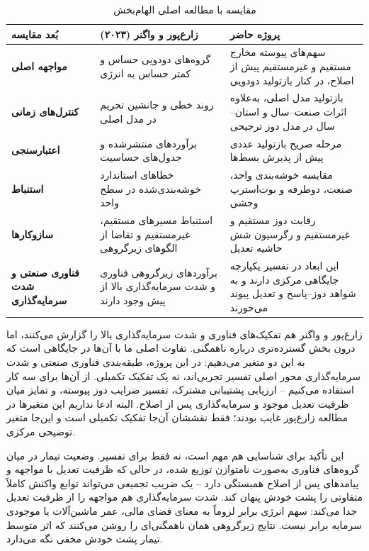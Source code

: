 \documentclass[11pt]{article}
\begin{document}
\begin{table}[htbp]
\centering
\caption{مقایسه با مطالعه اصلی الهام‌بخش}
\label{tab:comparison}
\begin{tabularx}{\textwidth}{>{\raggedleft\arraybackslash\bfseries}p{}YY}
\toprule
بُعد مقایسه & زارع‌پور و واگنر (۲۰۲۳) & پروژه حاضر \\
\midrule
مواجهه اصلی & گروه‌های دودویی حساس و کمتر حساس به انرژی & سهم‌های پیوسته مخارج مستقیم و غیرمستقیم پیش از اصلاح، در کنار بازتولید دودویی \\
کنترل‌های زمانی & روند خطی و جانشین تحریم در مدل اصلی & بازتولید مدل اصلی، به‌علاوه اثرات صنعت--سال و استان--سال در مدل دوز ترجیحی \\
اعتبارسنجی & برآوردهای منتشرشده و جدول‌های حساسیت & مرحله صریح بازتولید عددی پیش از پذیرش بسط‌ها \\
استنباط & خطاهای استاندارد خوشه‌بندی‌شده در سطح واحد & مقایسه خوشه‌بندی واحد، صنعت، دوطرفه و بوت‌استرپ وحشی \\
سازوکارها & استنباط مسیرهای مستقیم، غیرمستقیم و تقاضا از الگوهای زیرگروهی & رقابت دوز مستقیم و غیرمستقیم و رگرسیون شش حاشیه تعدیل \\
فناوری صنعتی و شدت سرمایه‌گذاری & برآوردهای زیرگروهی فناوری و شدت سرمایه‌گذاری بالا از پیش وجود دارند & این ابعاد در تفسیر یکپارچه جایگاهی مرکزی دارند و به شواهد دوز--پاسخ و تعدیل پیوند می‌خورند \\
\bottomrule
\end{tabularx}
\end{table}

زارع‌پور و واگنر هم تفکیک‌های فناوری و شدت سرمایه‌گذاری بالا را گزارش می‌کنند، اما درون بخش گسترده‌تری درباره ناهمگنی. تفاوت اصلی ما با آن‌ها در جایگاهی است که به این دو متغیر می‌دهیم: در این پروژه، طبقه‌بندی فناوری صنعتی و شدت سرمایه‌گذاری محور اصلی تفسیر تجربی‌اند، نه یک تفکیک تکمیلی. از آن‌ها برای سه کار استفاده می‌کنیم -- ارزیابی پشتیبانی مشترک، تفسیر ضرایب دوز پیوسته، و تمایز میان ظرفیت تعدیل موجود و سرمایه‌گذاری پس از اصلاح. البته ادعا نداریم این متغیرها در مطالعه زارع‌پور غایب بودند؛ فقط نقششان آن‌جا تفکیک تکمیلی است و این‌جا متغیر توضیحی مرکزی.

این تأکید برای شناسایی هم مهم است، نه فقط برای تفسیر. وضعیت تیمار در میان گروه‌های فناوری به‌صورت نامتوازن توزیع شده، در حالی که ظرفیت تعدیل با مواجهه و پیامدهای پس از اصلاح همبستگی دارد -- یک ضریب تجمیعی می‌تواند توابع واکنش کاملاً متفاوتی را پشت خودش پنهان کند. شدت سرمایه‌گذاری هم مواجهه را از ظرفیت تعدیل جدا می‌کند: سهم انرژی برابر لزوماً به معنای فضای مالی، عمر ماشین‌آلات یا موجودی سرمایه برابر نیست. نتایج زیرگروهی همان ناهمگنی‌ای را روشن می‌کنند که اثر متوسط تیمار پشت خودش مخفی نگه می‌دارد.
\end{document}
